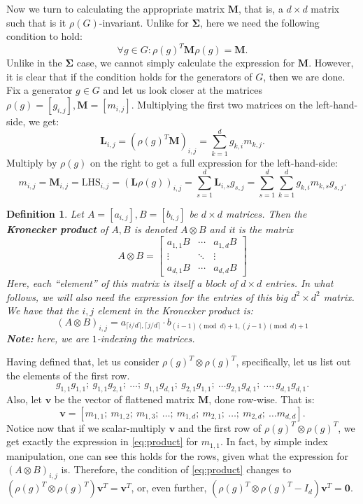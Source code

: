 \documentclass[11pt]{article}
\newtheorem{definition}[theorem]{Definition}
\begin{document}
Now we turn to calculating the appropriate matrix $\mathbf{M}$, that is, a $d\times d$
matrix such that is it $\rho(G)$-invariant.
Unlike for $\mathbf{\Sigma}$, here we need the following condition to hold:
\[\forall g \in G: \rho(g)^T\mathbf{M}\rho(g) = \mathbf{M}. \label{eq:m_require}\tag{$\dagger$}\]
Unlike in the $\mathbf{\Sigma}$ case, we cannot simply calculate the expression for $\mathbf{M}$.
However, it is clear that if the condition holds for the generators of $G$, then we are done.
Fix a generator $g \in G$ and let us look closer at the matrices $\rho(g) = [g_{i,j}], \mathbf{M} = [m_{i,j}]$.
Multiplying the first two matrices on the left-hand-side, we get:
\[\mathbf{L}_{i,j} = (\rho(g)^T\mathbf{M})_{i,j} = \sum_{k=1}^{d}g_{k,i}m_{k,j}.\]
Multiply by $\rho(g)$ on the right to get a full expression for the left-hand-side:
\[m_{i,j} = \mathbf{M}_{i,j} = \text{LHS}_{i,j} = (\mathbf{L}\rho(g))_{i,j} =
\sum_{s=1}^{d}\mathbf{L}_{i,s}g_{s,j} = \sum_{s=1}^{d}\sum_{k=1}^{d}g_{k,i}m_{k,s}g_{s,j}. \label{eq:product} \tag{$\clubsuit$}\]
\begin{definition}
  Let $A = [a_{i,j}], B = [b_{i,j}]$ be $d\times d$ matrices. Then the
  \textbf{Kronecker product} of $A, B$ is denoted $A \otimes B$ and it is the matrix
  \[A \otimes B = \begin{bmatrix} a_{1,1}B & \cdots & a_{1,d}B\\
    \vdots & \ddots & \vdots \\ a_{d,1}B & \cdots & a_{d,d}B\end{bmatrix}\]
  \doublespacing
  Here, each ``element'' of this matrix is itself a block of $d\times d$ entries.
  In what follows, we will also need the expression for the entries of
  this big $d^2 \times d^2$ matrix. We have that the $i,j$ element in the
  Kronecker product is:
  \[(A \otimes B)_{i,j} = a_{\lceil i/d \rceil, \lceil j/d \rceil}\cdot b_{(i-1)\pmod d+1,(j-1)\pmod d+1}\]  
  \textbf{Note:} here, we are $1$-indexing the matrices.
\end{definition}
Having defined that, let us consider $\rho(g)^T \otimes \rho(g)^T$, specifically, let us list out the elements of the first row.
\[g_{1,1}g_{1,1};~g_{1,1}g_{2,1};~\ldots;~g_{1,1}g_{d,1};~g_{2,1}g_{1,1};~\ldots g_{2,1}g_{d,1};~\ldots, g_{d,1}g_{d,1}.\]
Also, let $\mathbf{v}$ be the vector of flattened matrix $\mathbf{M}$, done row-wise. That is:
\[\mathbf{v} = [m_{1,1};~ m_{1,2};~ m_{1,3};~ \ldots;~ m_{1,d};~ m_{2,1};~ \ldots;~ m_{2,d};~ \ldots m_{d,d}].\]
Notice now that if we scalar-multiply $\mathbf{v}$ and the first row of $\rho(g)^T \otimes \rho(g)^T$, we get exactly
the expression in \cref{eq:product} for $m_{1,1}$. In fact, by simple index manipulation, one
can see this holds for the rows, given what the expression for $(A \otimes B)_{i,j}$ is.
Therefore, the condition of \cref{eq:product} changes to $\left(\rho(g)^T \otimes \rho(g)^T\right)\mathbf{v}^T = \mathbf{v}^T$,
or, even further, $\left(\rho(g)^T \otimes \rho(g)^T - I_d\right)\mathbf{v}^T = \mathbf{0}$.
\end{document}
